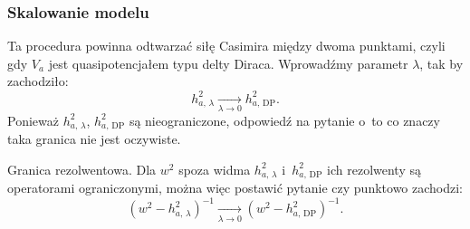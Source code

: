 \documentclass[10pt,t]{beamer}
\begin{document}
\begin{frame}
  \frametitle{Skalowanie modelu}


  Ta procedura powinna odtwarzać siłę Casimira między dwoma punktami,
  czyli gdy $V_{ a }$ jest quasipotencjałem typu delty Diraca. Wprowadźmy
  parametr $\lambda$, tak by zachodziło:
  \begin{equation}
    \label{eq:Efekt-Casimira-19}
    h_{ a,\, \lambda }^{ 2 } \xrightarrow[ \lambda \to 0 ]{}
    h_{ a,\, \textrm{DP} }^{ 2 }.
  \end{equation}
  Ponieważ $h_{ a,\, \lambda }^{ 2 }$, $h_{ a,\, \textrm{DP} }^{ 2 }$ są
  nieograniczone, odpowiedź na pytanie o~to co znaczy taka granica
  nie jest oczywiste.

  Granica rezolwentowa. Dla $w^{ 2 }$ spoza widma $h_{ a,\, \lambda }^{ 2 }$
  i~$h_{ a,\, \textrm{DP} }^{ 2 }$ ich rezolwenty są operatorami
  ograniczonymi, można więc postawić pytanie czy punktowo zachodzi:
  \begin{equation}
    \label{eq:Efekt-Casimira-20}
    ( w^{ 2 } - h_{ a,\, \lambda }^{ 2 } )^{ -1 }
    \xrightarrow[ \lambda \to 0 ]{}
    ( w^{ 2 } - h_{ a,\, \textrm{DP} }^{ 2 } )^{ -1 }.
  \end{equation}

\end{frame}
\end{document}
